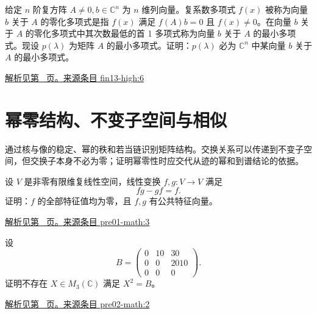 \documentclass[12pt,fontset=fandol]{ctexart}
\begin{document}
\begin{example}\label{ex:fin13-high:6}

给定 $n$ 阶复方阵 $A \neq 0, b \in \mathbb{C}^n$ 为 $n$ 维列向量。复系数多项式 $f(x)$ 被称为向量 $b$ 关于 $A$ 的零化多项式是指 $f(x)$ 满足 $f(A)b = 0$ 且 $f(x) \neq 0$。在向量 $b$ 关于 $A$ 的零化多项式中其次数最低的首 1 多项式称为向量 $b$ 关于 $A$ 的最小多项式。现设 $p(\lambda)$ 为矩阵 $A$ 的最小多项式。证明：$p(\lambda)$ 必为 $\mathbb{C}^n$ 中某向量 $b$ 关于 $A$ 的最小多项式。

\par\hyperref[ans:fin13-high:6]{解析见第~\pageref{ans:fin13-high:6} 页。}\quad\href{https://github.com/lzxcr/cmc-mathematics/blob/64916fa1fdbc3e444a652eca204d5669058ee321/src/problems/finals/13/06.md}{来源条目 fin13-high:6}

\end{example}

\section{幂零结构、不变子空间与相似}

\label{sec:questions-6}

通过核与像的稳定、幂的秩和若当链识别矩阵结构。交换关系可以传递到不变子空间，但交换子本身不必为零；证明幂零性时应交代从迹的幂和到谱结论的依据。

\begin{example}\label{ex:pre01-math:3}

设 $V$ 是非零有限维复线性空间，线性变换 $f,g:V\to V$ 满足
\[
fg-gf=f.
\]
证明：$f$ 的全部特征值均为零，且 $f,g$ 有公共特征向量。

\par\hyperref[ans:pre01-math:3]{解析见第~\pageref{ans:pre01-math:3} 页。}\quad\href{https://github.com/lzxcr/cmc-mathematics/blob/64916fa1fdbc3e444a652eca204d5669058ee321/src/problems/preliminary/01/03.md}{来源条目 pre01-math:3}

\end{example}

\begin{example}\label{ex:pre02-math:2}

设
\[
B=\begin{pmatrix}0&10&30\\0&0&2010\\0&0&0\end{pmatrix}.
\]
证明不存在 $X\in M_3(\mathbb C)$ 满足 $X^2=B$。

\par\hyperref[ans:pre02-math:2]{解析见第~\pageref{ans:pre02-math:2} 页。}\quad\href{https://github.com/lzxcr/cmc-mathematics/blob/64916fa1fdbc3e444a652eca204d5669058ee321/src/problems/preliminary/02/02.md}{来源条目 pre02-math:2}

\end{example}
\end{document}
